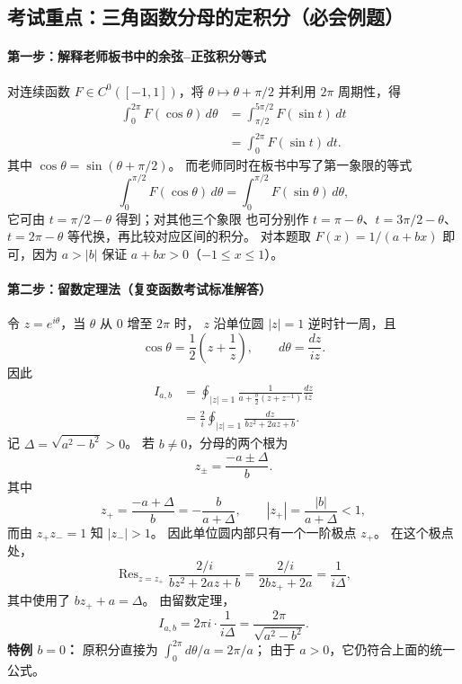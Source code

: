 \subsection*{考试重点：三角函数分母的定积分（必会例题）}

\begin{center}
\end{center}

\paragraph{第一步：解释老师板书中的余弦--正弦积分等式}
对连续函数 $F\in C^0([-1,1])$，将
$\theta\mapsto\theta+\pi/2$ 并利用 $2\pi$ 周期性，得
\begin{align*}
  \int_0^{2\pi} F(\cos\theta)\,d\theta
  &=\int_{\pi/2}^{5\pi/2}F(\sin t)\,dt\\
  &=\int_0^{2\pi}F(\sin t)\,dt.
\end{align*}
其中 $\cos\theta=\sin(\theta+\pi/2)$。
而老师同时在板书中写了第一象限的等式
\[
  \int_0^{\pi/2}F(\cos\theta)\,d\theta
  =\int_0^{\pi/2}F(\sin\theta)\,d\theta,
\]
它可由 $t=\pi/2-\theta$ 得到；对其他三个象限
也可分别作 $t=\pi-\theta$、$t=3\pi/2-\theta$、
$t=2\pi-\theta$ 等代换，再比较对应区间的积分。
对本题取 $F(x)=1/(a+bx)$ 即可，因为
$a>|b|$ 保证 $a+bx>0$（$-1\le x\le1$）。

\paragraph{第二步：留数定理法（复变函数考试标准解答）}
令 $z=e^{i\theta}$，当 $\theta$ 从 $0$ 增至 $2\pi$ 时，
$z$ 沿单位圆 $|z|=1$ 逆时针一周，且
\[
  \cos\theta=\frac12\left(z+\frac1z\right),
  \qquad d\theta=\frac{dz}{iz}.
\]
因此
\begin{align*}
  I_{a,b}
  &=\oint_{|z|=1}
      \frac{1}{a+\frac b2(z+z^{-1})}\frac{dz}{iz}\\
  &=\frac{2}{i}\oint_{|z|=1}
      \frac{dz}{bz^2+2az+b}.
\end{align*}
记 $\Delta=\sqrt{a^2-b^2}>0$。
若 $b\ne0$，分母的两个根为
\[
  z_{\pm}=\frac{-a\pm\Delta}{b}.
\]
其中
\[
  z_+=\frac{-a+\Delta}{b}
      =-\frac{b}{a+\Delta},
  \qquad |z_+|=\frac{|b|}{a+\Delta}<1,
\]
而由 $z_+z_-=1$ 知 $|z_-|>1$。
因此单位圆内部只有一个一阶极点 $z_+$。
在这个极点处，
\[
  \operatorname{Res}_{z=z_+}
   \frac{2/i}{bz^2+2az+b}
  =\frac{2/i}{2bz_++2a}
  =\frac{1}{i\Delta},
\]
其中使用了 $bz_++a=\Delta$。
由留数定理，
\[
  I_{a,b}
   =2\pi i\cdot\frac{1}{i\Delta}
   =\boxed{\frac{2\pi}{\sqrt{a^2-b^2}}}.
\]
\textbf{特例 $b=0$：} 原积分直接为
$\int_0^{2\pi}d\theta/a=2\pi/a$；
由于 $a>0$，它仍符合上面的统一公式。


